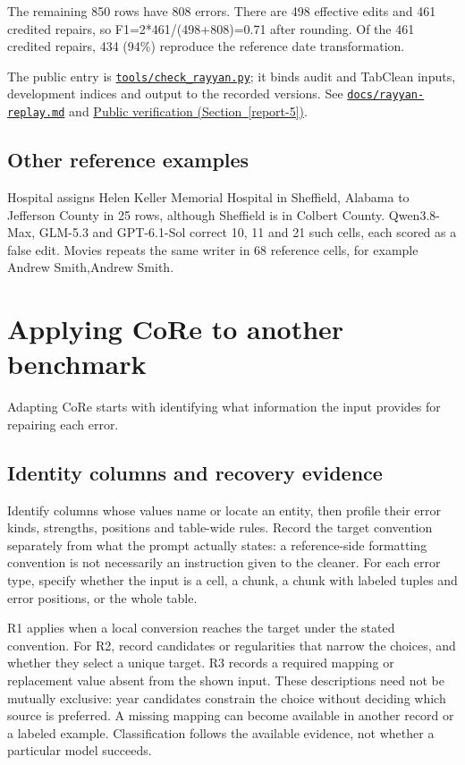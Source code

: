 \documentclass[10pt,a4paper]{article}
\begin{document}
The remaining 850 rows have 808 errors. There are 498 effective edits and 461 credited repairs, so {\ttfamily\small F1=2*461/\allowbreak{}(498+808)=0.71} after rounding. Of the 461 credited repairs, 434 (94\%) reproduce the reference date transformation.

The public entry is \href{https://github.com/hinsonver/CoRe-Benchmark/blob/main/tools/check_rayyan.py}{\nolinkurl{tools/check_rayyan.py}}; it binds audit and TabClean inputs, development indices and output to the recorded versions. See \href{https://github.com/hinsonver/CoRe-Benchmark/blob/main/docs/rayyan-replay.md}{\nolinkurl{docs/rayyan-replay.md}} and \hyperlink{companion-5}{Public verification (Section~\ref{report-5})}.

\subsection{Other reference examples}

Hospital assigns Helen Keller Memorial Hospital in Sheffield, Alabama to Jefferson County in 25 rows, although Sheffield is in Colbert County. Qwen3.8-Max, GLM-5.3 and GPT-6.1-Sol correct 10, 11 and 21 such cells, each scored as a false edit. Movies repeats the same writer in 68 reference cells, for example {\ttfamily\small Andrew Smith,Andrew Smith}.
\clearpage
\section{Applying CoRe to another benchmark}
\hypertarget{companion-4}{}\label{report-4}

Adapting CoRe starts with identifying what information the input provides for repairing each error.

\subsection{Identity columns and recovery evidence}

Identify columns whose values name or locate an entity, then profile their error kinds,
strengths, positions and table-wide rules. Record the target convention separately from what
the prompt actually states: a reference-side formatting convention is not necessarily an
instruction given to the cleaner. For each error type, specify whether the input is a cell,
a chunk, a chunk with labeled tuples and error positions, or the whole table.

R1 applies when a local conversion reaches the target under the stated convention.
For R2, record candidates or regularities that narrow the choices, and whether they select
a unique target. R3 records a required mapping or replacement value absent from the shown
input. These descriptions need not be mutually exclusive: year candidates constrain the
choice without deciding which source is preferred. A missing mapping can become available
in another record or a labeled example. Classification follows the available evidence, not
whether a particular model succeeds.
\end{document}
